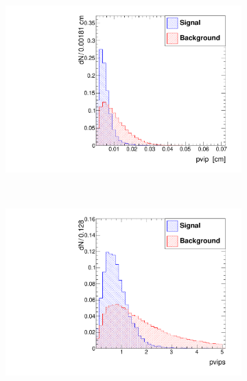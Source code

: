 \documentclass[10pt,a4paper]{article}
\begin{document}
\begin{figure}
        \begin{subfigure}[b]{0.2\textwidth}
                \centering
                \includegraphics[width=\textwidth]{Figures/pvip_endcaps}
                \label{fig:pvipEndcaps}
        \end{subfigure}%
        ~
        \begin{subfigure}[b]{0.2\textwidth}
                \centering
                \includegraphics[width=\textwidth]{Figures/pvips_endcaps}
                \label{fig:pvipsEncaps}
        \end{subfigure}
        ~
        \begin{subfigure}[b]{0.2\textwidth}
                \centering

\end{subfigure}
\end{figure}
\end{document}
